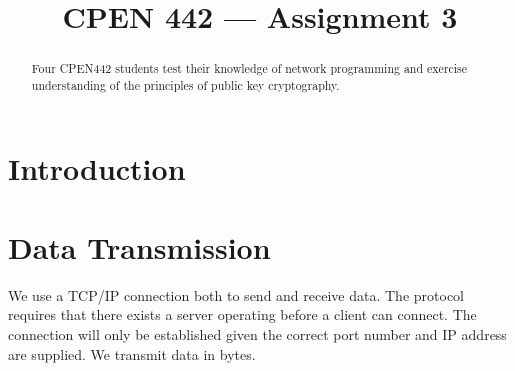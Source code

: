 \documentclass[conference]{IEEEtran}
\begin{document}
\title{CPEN 442 --- Assignment 3}


\author{
\and
{}
}


\maketitle

\begin{abstract}
Four CPEN442 students test their knowledge of network programming and exercise understanding of the principles of public key cryptography. 
\end{abstract}



\section{Introduction}

\section{Data Transmission}
We use a TCP/IP connection both to send and receive data. The protocol requires that there exists a server operating before a client can connect. The connection will only be established given the correct port number and IP address are supplied. We transmit data in bytes. 
\end{document}
